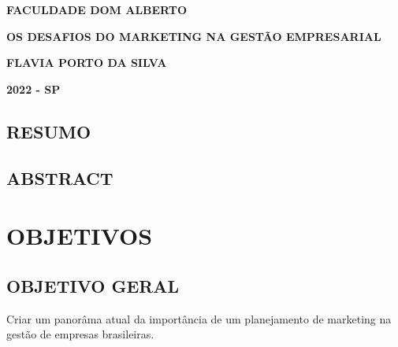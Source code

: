 \documentclass[article, a4paper, 12pt, brazil]{abntex2}
\begin{document}
   \begin{center} %
      \textbf{
         FACULDADE DOM ALBERTO\\ %
      }

      \vspace{7cm}

      \textbf{
         OS DESAFIOS DO MARKETING NA GESTÃO EMPRESARIAL\\ %
      }

      \vspace{5cm}

      \textbf{
         FLAVIA PORTO DA SILVA\\ %
      }

      \vspace{10cm}

      \textbf{
         2022 \-- SP %
      }
   \end{center}
   \newpage
   \begin{center}
      \section*{RESUMO}
   \end{center}

   \newpage
   \begin{center}
      \section*{ABSTRACT}
   \end{center}
   \pagebreak
   \section{OBJETIVOS}

   \subsection{OBJETIVO GERAL}
   Criar um panorâma atual da importância de um planejamento de marketing na gestão de empresas brasileiras.
\end{document}
